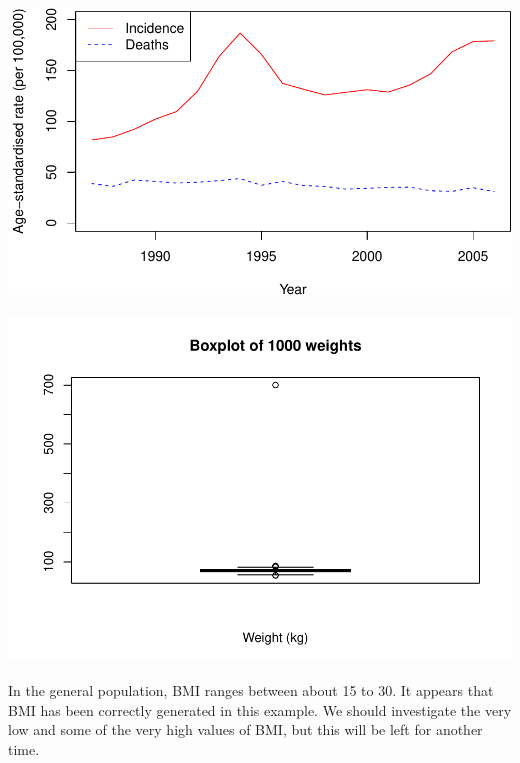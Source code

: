 \documentclass[
]{memoir}
\newenvironment{Shaded}{\begin{snugshade}}{\end{snugshade}}
\newcommand{\FunctionTok}[1]{\textcolor[rgb]{0.00,0.00,0.00}{#1}}
\newcommand{\NormalTok}[1]{#1}
\newcommand{\SpecialCharTok}[1]{\textcolor[rgb]{0.00,0.00,0.00}{#1}}
\begin{document}
\begin{Shaded}
\end{Shaded}

\includegraphics{phcm9795-R-notes_files/figure-latex/unnamed-chunk-51-1.pdf}

\begin{Shaded}
\end{Shaded}

\includegraphics{phcm9795-R-notes_files/figure-latex/unnamed-chunk-51-2.pdf}

In the general population, BMI ranges between about 15 to 30. It appears that BMI has been correctly generated in this example. We should investigate the very low and some of the very high values of BMI, but this will be left for another time.
\end{document}
